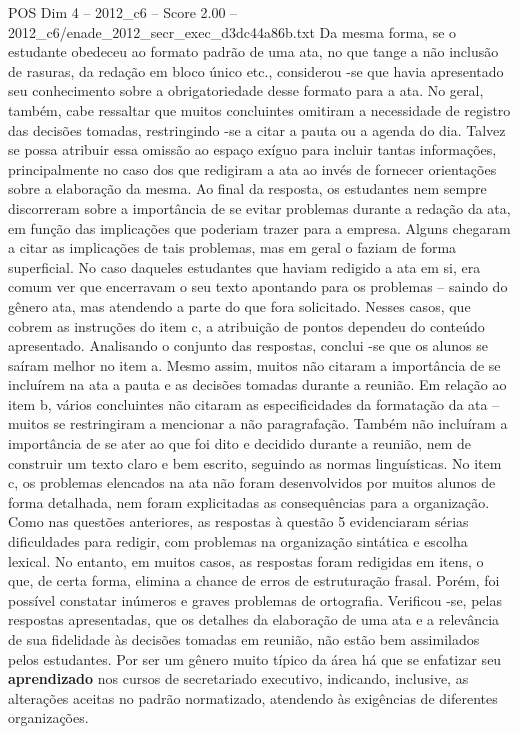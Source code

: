 \begin{textsample}{POS Dim 4 – 2012\_c6 – Score 2.00 – 2012\_c6/enade\_2012\_secr\_exec\_d3dc44a86b.txt}
Da mesma forma, se o estudante obedeceu ao formato padrão de uma ata, no que tange a não inclusão de rasuras, da redação em bloco único etc., considerou -se que havia apresentado seu conhecimento sobre a obrigatoriedade desse formato para a ata.
No geral, também, cabe ressaltar que muitos concluintes omitiram a necessidade de registro das decisões tomadas, restringindo -se a citar a pauta ou a agenda do dia.
Talvez se possa atribuir essa omissão ao espaço exíguo para incluir tantas informações, principalmente no caso dos que redigiram a ata ao invés de fornecer orientações sobre a elaboração da mesma.
Ao final da resposta, os estudantes nem sempre discorreram sobre a importância de se evitar problemas durante a redação da ata, em função das implicações que poderiam trazer para a empresa.
Alguns chegaram a citar as implicações de tais problemas, mas em geral o faziam de forma superficial.
No caso daqueles estudantes que haviam redigido a ata em si, era comum ver que encerravam o seu texto apontando para os problemas – saindo do gênero ata, mas atendendo a parte do que fora solicitado.
Nesses casos, que cobrem as instruções do item c, a atribuição de pontos dependeu do conteúdo apresentado.
Analisando o conjunto das respostas, conclui -se que os alunos se saíram melhor no item a.
Mesmo assim, muitos não citaram a importância de se incluírem na ata a pauta e as decisões tomadas durante a reunião.
Em relação ao item b, vários concluintes não citaram as especificidades da formatação da ata – muitos se restringiram a mencionar a não paragrafação.
Também não incluíram a importância de se ater ao que foi dito e decidido durante a reunião, nem de construir um texto claro e bem escrito, seguindo as normas linguísticas.
No item c, os problemas elencados na ata não foram desenvolvidos por muitos alunos de forma detalhada, nem foram explicitadas as consequências para a organização.
Como nas questões anteriores, as respostas à questão 5 evidenciaram sérias dificuldades para redigir, com problemas na organização sintática e escolha lexical.
No entanto, em muitos casos, as respostas foram redigidas em itens, o que, de certa forma, elimina a chance de erros de estruturação frasal.
Porém, foi possível constatar inúmeros e graves problemas de ortografia.
Verificou -se, pelas respostas apresentadas, que os detalhes da elaboração de uma ata e a relevância de sua fidelidade às decisões tomadas em reunião, não estão bem assimilados pelos estudantes.
Por ser um gênero muito típico da área há que se enfatizar seu \textbf{aprendizado} nos cursos de secretariado executivo, indicando, inclusive, as alterações aceitas no padrão normatizado, atendendo às exigências de diferentes organizações.

\end{textsample}
